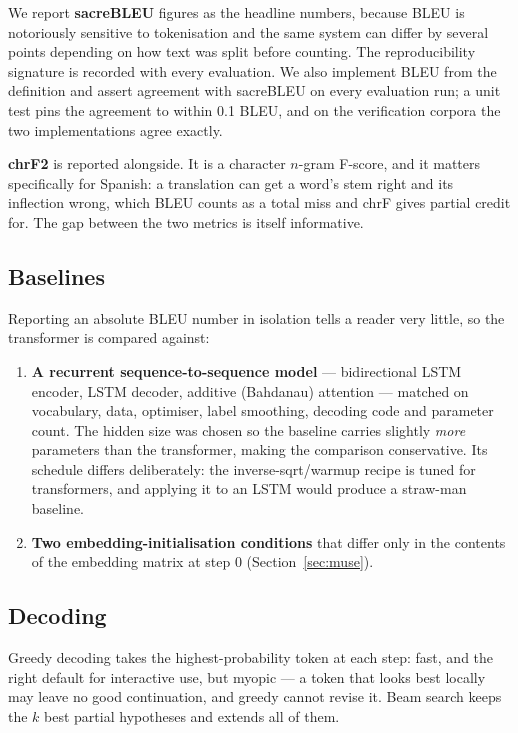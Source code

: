 \documentclass[11pt,a4paper]{article}
\begin{document}
We report \textbf{sacreBLEU} \cite{post2018} figures as the headline numbers,
because BLEU is notoriously sensitive to tokenisation and the same system can
differ by several points depending on how text was split before counting. The
reproducibility signature is recorded with every evaluation. We also implement
BLEU from the definition and assert agreement with sacreBLEU on every
evaluation run; a unit test pins the agreement to within 0.1 BLEU, and on the
verification corpora the two implementations agree exactly.

\textbf{chrF2} \cite{popovic2015} is reported alongside. It is a character
$n$-gram F-score, and it matters specifically for Spanish: a translation can get
a word's stem right and its inflection wrong, which BLEU counts as a total miss
and chrF gives partial credit for. The gap between the two metrics is itself
informative.

\subsection{Baselines}

Reporting an absolute BLEU number in isolation tells a reader very little, so
the transformer is compared against:

\begin{enumerate}
  \item \textbf{A recurrent sequence-to-sequence model} --- bidirectional LSTM
    encoder, LSTM decoder, additive (Bahdanau) attention \cite{bahdanau2015}
    --- matched on vocabulary, data, optimiser, label smoothing, decoding code
    and parameter count. The hidden size was chosen so the baseline carries
    slightly \emph{more} parameters than the transformer, making the comparison
    conservative. Its schedule differs deliberately: the inverse-sqrt/warmup
    recipe is tuned for transformers, and applying it to an LSTM would produce
    a straw-man baseline.
  \item \textbf{Two embedding-initialisation conditions} that differ only in
    the contents of the embedding matrix at step 0 (Section~\ref{sec:muse}).
\end{enumerate}

\subsection{Decoding}

Greedy decoding takes the highest-probability token at each step: fast, and the
right default for interactive use, but myopic --- a token that looks best
locally may leave no good continuation, and greedy cannot revise it. Beam
search keeps the $k$ best partial hypotheses and extends all of them.
\end{document}
